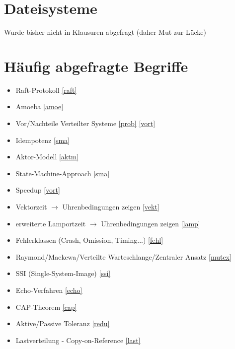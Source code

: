 \documentclass{scrartcl}
\begin{document}
\newpage
%
%

\section{Dateisysteme}
Wurde bisher nicht in Klausuren abgefragt (daher Mut zur Lücke)

%
\newpage
%
%

\section{Häufig abgefragte Begriffe}
\begin{itemize}
\item Raft-Protokoll \ref{raft}
\item Amoeba \ref{amoe}
\item Vor/Nachteile Verteilter Systeme \ref{prob} \ref{vort}
\item Idempotenz \ref{sma}
\item Aktor-Modell \ref{aktm}
\item State-Machine-Approach \ref{sma}
\item Speedup \ref{vort}
\item Vektorzeit $\rightarrow$ Uhrenbedingungen zeigen \ref{vekt}
\item erweiterte Lamportzeit $\rightarrow$ Uhrenbedingungen zeigen \ref{lamp}
\item Fehlerklassen (Crash, Omission, Timing...) \ref{fehl}
\item Raymond/Maekewa/Verteilte Warteschlange/Zentraler Ansatz \ref{mutex}
\item SSI (Single-System-Image) \ref{ssi}
\item Echo-Verfahren \ref{echo}
\item CAP-Theorem  \ref{cap}
\item Aktive/Passive Toleranz \ref{redu}
\item Lastverteilung - Copy-on-Reference \ref{last}
\end{itemize}



%
%
\end{document}
